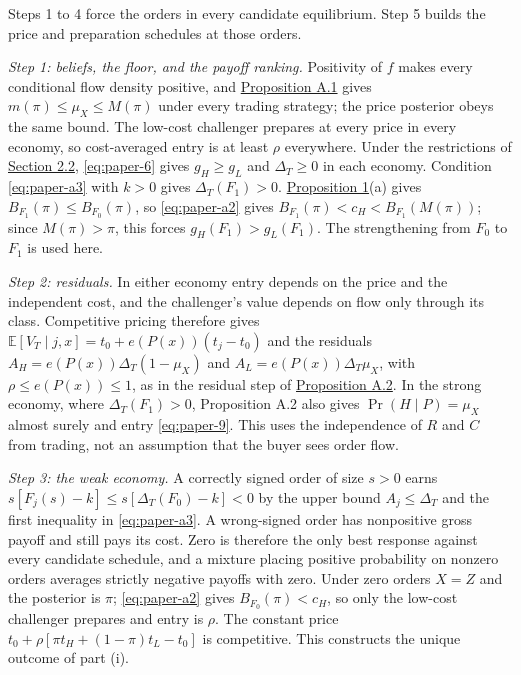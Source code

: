 Steps 1 to 4 force the orders in every candidate equilibrium. Step 5
builds the price and preparation schedules at those orders.

\emph{Step 1: beliefs, the floor, and the payoff ranking.} Positivity of
\(f\) makes every conditional flow density positive, and
\hyperref[result-proposition-a-1]{Proposition A.1} gives
\(m(\pi)\le\mu_X\le M(\pi)\) under every trading strategy; the price
posterior obeys the same bound. The low-cost challenger prepares at
every price in every economy, so cost-averaged entry is at least
\(\rho\) everywhere. Under the restrictions of
\hyperref[sec-values-preparation-and-the-sale]{Section 2.2},
\eqref{eq:paper-6} gives \(g_H\ge g_L\) and \(\Delta_T\ge0\) in each
economy. Condition \eqref{eq:paper-a3} with \(k>0\) gives
\(\Delta_T(F_1)>0\).
\hyperref[result-proposition-1]{Proposition 1}(a) gives
\(B_{F_1}(\pi)\le B_{F_0}(\pi)\), so \eqref{eq:paper-a2} gives
\(B_{F_1}(\pi)<c_H<B_{F_1}(M(\pi))\); since \(M(\pi)>\pi\), this forces
\(g_H(F_1)>g_L(F_1)\). The strengthening from \(F_0\) to \(F_1\) is
used here.

\emph{Step 2: residuals.} In either economy entry depends on the price
and the independent cost, and the challenger's value depends on flow
only through its class. Competitive pricing therefore gives
\(\mathbb E[V_T\mid j,x]=t_0+e(P(x))(t_j-t_0)\) and the residuals
\(A_H=e(P(x))\Delta_T(1-\mu_X)\) and \(A_L=e(P(x))\Delta_T\mu_X\), with
\(\rho\le e(P(x))\le1\), as in the residual step of
\hyperref[result-proposition-a-2]{Proposition A.2}. In the strong
economy, where \(\Delta_T(F_1)>0\), Proposition A.2 also gives
\(\Pr(H\mid P)=\mu_X\) almost surely and entry \eqref{eq:paper-9}. This
uses the independence of \(R\) and \(C\) from trading, not an assumption
that the buyer sees order flow.

\emph{Step 3: the weak economy.} A correctly signed order of size
\(s>0\) earns \(s[F_j(s)-k]\le s[\Delta_T(F_0)-k]<0\) by the upper
bound \(A_j\le\Delta_T\) and the first inequality in
\eqref{eq:paper-a3}. A wrong-signed order has nonpositive gross payoff
and still pays its cost. Zero is therefore the only best response
against every candidate schedule, and a mixture placing positive
probability on nonzero orders averages strictly negative payoffs with
zero. Under zero orders \(X=Z\) and the posterior is \(\pi\);
\eqref{eq:paper-a2} gives \(B_{F_0}(\pi)<c_H\), so only the low-cost
challenger prepares and entry is \(\rho\). The constant price
\(t_0+\rho[\pi t_H+(1-\pi)t_L-t_0]\) is competitive. This constructs the
unique outcome of part (i).

